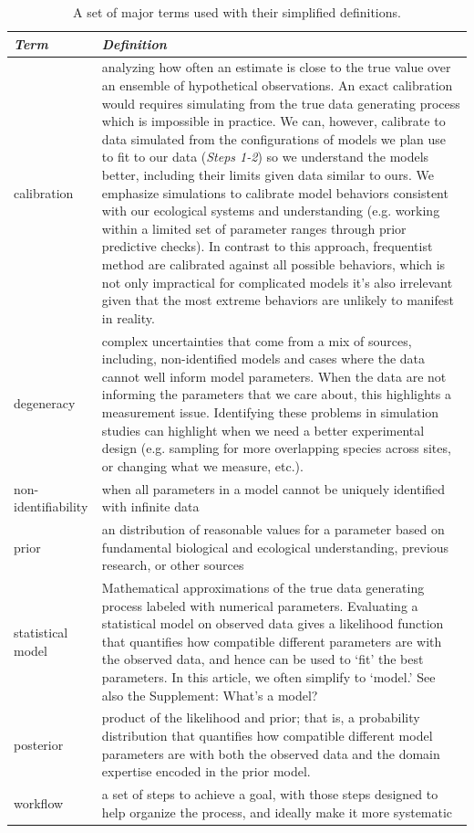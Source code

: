 \documentclass[11pt]{article}
\begin{document}
\begin{table}
\caption{A set of major terms used with their simplified definitions.}
\begin{tabular}{ p{3 cm}  p{13 cm} }  \hline \hline
 \emph{Term}   & \emph{Definition}\\ 
\hline \hline
calibration & analyzing how often an estimate is close to the true value over an ensemble of hypothetical observations.  An exact calibration would requires simulating from the true data generating process which is impossible in practice.  We can, however, calibrate to data simulated from the configurations of models we plan use to fit to our data (\emph{Steps 1-2}) so we understand the models better, including their limits given data similar to ours. We emphasize simulations to calibrate model behaviors consistent with our ecological systems and understanding (e.g. working within a limited set of parameter ranges through prior predictive checks). In contrast to this approach, frequentist method are calibrated against all possible behaviors, which is not only impractical for complicated models it’s also irrelevant given that the most extreme behaviors are unlikely to manifest in reality. \\\hline
degeneracy & complex uncertainties that come from a mix of sources, including, non-identified models and cases where the data cannot well inform model parameters. When the data are not informing the parameters that we care about, this highlights a measurement issue. Identifying these problems in simulation studies can highlight when we need a better experimental design (e.g. sampling for more overlapping species across sites, or changing what we measure, etc.).  \\\hline
non-identifiability & when all parameters in a model cannot be uniquely identified with infinite data \\\hline
prior & an distribution of reasonable values for a parameter based on fundamental biological and ecological understanding, previous research, or other sources \\\hline
statistical model & Mathematical approximations of the true data generating process labeled with numerical parameters.  Evaluating a statistical model on observed data gives a likelihood function that quantifies how compatible different parameters are with the observed data, and hence can be used to `fit' the best parameters. In this article, we often simplify to `model.' See also the Supplement: What's a model? \\\hline
posterior & product of the likelihood and prior; that is, a probability distribution that quantifies how compatible different model parameters are with both the observed data and the domain expertise encoded in the prior model. \\\hline
workflow & a set of steps to achieve a goal, with those steps designed to help organize the process, and ideally make it more systematic  \\\hline
\hline
\end{tabular}
\label{tab:glossary}
\end{table}
\end{document}
